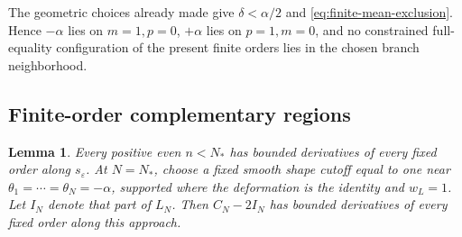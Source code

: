 \documentclass[11pt]{article}
\numberwithin{equation}{section}
\newtheorem{lemma}[theorem]{Lemma}
\theoremstyle{remark}\newtheorem{remark}[theorem]{Remark}
\begin{document}
The geometric choices already made give $\delta<\alpha/2$ and
\eqref{eq:finite-mean-exclusion}. Hence $-\alpha$ lies on
$m=1,p=0$, $+\alpha$ lies on $p=1,m=0$, and no constrained
full-equality configuration of the present finite orders lies in
the chosen branch neighborhood.

\subsection{Finite-order complementary regions}

\begin{lemma}\label{lem:finite-complement}
Every positive even $n<N_*$ has bounded derivatives of every
fixed order along $s_\varepsilon$. At $N=N_*$, choose a fixed
smooth shape cutoff equal to one near
$\theta_1=\cdots=\theta_N=-\alpha$, supported where the
deformation is the identity and $w_L=1$. Let $I_N$ denote
that part of $L_N$. Then $C_N-2I_N$ has bounded derivatives
of every fixed order along this approach.
\end{lemma}
\end{document}
